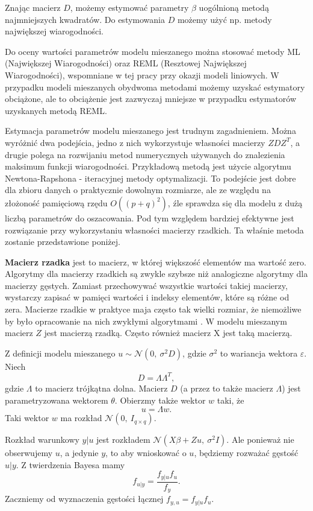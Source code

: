 \documentclass[12pt]{mwbk}
\theoremstyle{plain}
\theoremstyle{definition}
\theoremstyle{definition}
\begin{document}
Znając macierz $D$, możemy estymować parametry $\beta$ uogólnioną metodą najmniejszych kwadratów. Do estymowania $D$ możemy użyć np. metody największej wiarogodności.

Do oceny wartości parametrów modelu mieszanego można stosować metody ML (Największej Wiarogodności) oraz REML (Resztowej Największej Wiarogodności), wspomniane w tej pracy przy okazji modeli liniowych. W przypadku modeli mieszanych obydwoma metodami możemy uzyskać estymatory obciążone, ale to obciążenie jest zazwyczaj mniejsze w przypadku estymatorów uzyskanych metodą REML.


Estymacja parametrów modelu mieszanego jest trudnym zagadnieniem. Można wyróżnić dwa podejścia, jedno z nich wykorzystuje własności macierzy $ZDZ^T$, a drugie polega na rozwijaniu metod numerycznych używanych do znalezienia maksimum funkcji wiarogodności. Przykładową metodą jest użycie algorytmu Newtona-Rapshona - iteracyjnej metody optymalizacji. To podejście jest dobre dla zbioru danych o praktycznie dowolnym rozmiarze, ale ze względu na złożoność pamięciową rzędu $O((p+q)^2)$, źle sprawdza się dla modelu z dużą liczbą parametrów do oszacowania. Pod tym względem bardziej efektywne jest rozwiązanie przy wykorzystaniu własności macierzy rzadkich. Ta właśnie metoda zostanie przedstawione poniżej.

\textbf{Macierz rzadka} jest to macierz, w której większość elementów ma wartość zero. Algorytmy dla macierzy rzadkich są zwykle szybsze niż analogiczne algorytmy dla macierzy gęstych. Zamiast przechowywać wszystkie wartości takiej macierzy, wystarczy zapisać w pamięci wartości i indeksy elementów, które są różne od zera. Macierze rzadkie w praktyce maja często tak wielki rozmiar, że niemożliwe by było opracowanie na nich zwykłymi algorytmami \cite{rzadka}. W modelu mieszanym macierz $Z$ jest macierzą rzadką. Często również macierz X jest taką macierzą.

Z definicji modelu mieszanego $u \sim \mathcal{N}(0,~\sigma^2D)$, gdzie $\sigma^2$ to wariancja wektora $\varepsilon$. Niech $$D=\Lambda \Lambda^T,$$ gdzie $\Lambda$ to macierz trójkątna dolna. Macierz $D$ (a przez to także macierz $\Lambda$) jest parametryzowana wektorem $\theta$. Obierzmy także wektor $w$ taki, że $$u=\Lambda w.$$ Taki wektor $w$ ma rozkład $\mathcal{N}(0,~I_{q \times q})$.



Rozkład warunkowy $y|u$ jest rozkładem $\mathcal{N}(X\beta+Zu,~\sigma^2I)$. Ale ponieważ nie obserwujemy $u$, a jedynie $y$, to aby wnioskować o $u$, będziemy rozważać gęstość $u|y$. Z twierdzenia Bayesa \cite{bayes} mamy $$f_{u|y}=\frac{f_{y|u}f_u}{f_y}.$$ Zaczniemy od wyznaczenia gęstości łącznej $f_{y,u}=f_{y|u}f_u$.
\end{document}
